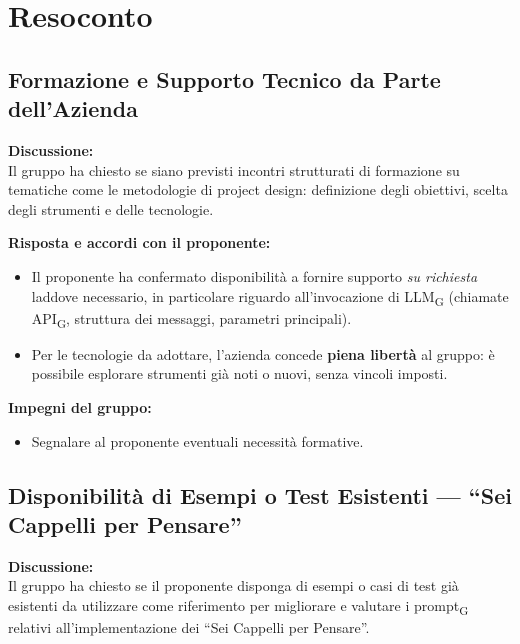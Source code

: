 \section{Resoconto}

\subsection{Formazione e Supporto Tecnico da Parte dell'Azienda}

\textbf{Discussione:}\\
Il gruppo ha chiesto se siano previsti incontri strutturati di formazione su tematiche come le metodologie di project design: definizione degli obiettivi, scelta degli strumenti e delle tecnologie.

\vspace{0.3cm}
\textbf{Risposta e accordi con il proponente:}
\begin{itemize}[leftmargin=1.5em, itemsep=3pt]
    \item Il proponente ha confermato disponibilità a fornire supporto \textit{su richiesta} laddove necessario, in particolare riguardo all'invocazione di LLM\textsubscript{G} (chiamate API\textsubscript{G}, struttura dei messaggi, parametri principali).
    \item Per le tecnologie da adottare, l'azienda concede \textbf{piena libertà} al gruppo: è possibile esplorare strumenti già noti o nuovi, senza vincoli imposti.
\end{itemize}

\vspace{0.1cm}
\textbf{Impegni del gruppo:}
\begin{itemize}[leftmargin=1.5em, itemsep=3pt]
    \item Segnalare al proponente eventuali necessità formative.
\end{itemize}

\vspace{0.4cm}

\subsection{Disponibilità di Esempi o Test Esistenti — ``Sei Cappelli per Pensare''}

\textbf{Discussione:}\\
Il gruppo ha chiesto se il proponente disponga di esempi o casi di test già esistenti da utilizzare come riferimento per migliorare e valutare i prompt\textsubscript{G} relativi all'implementazione dei ``Sei Cappelli per Pensare''.

